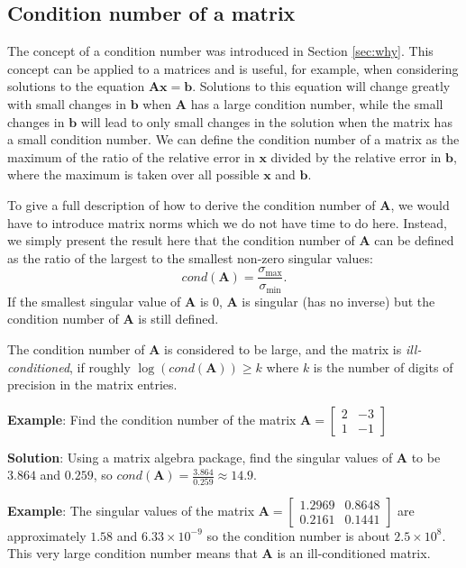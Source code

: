 \subsection{Condition number of a matrix}

The concept of a condition number was introduced in  Section \ref{sec:why}.  This concept can be applied to a matrices and is useful, for example, when considering solutions to the equation $\mathbf {Ax} = \mathbf b$.  Solutions to this equation will change greatly with  small changes in $\mathbf b$ when $\mathbf A$ has a large condition number, while the small changes in  $\mathbf b$ will lead to only small changes in the solution when the matrix has a small condition number.  We can define the condition number of a matrix as the maximum of the  ratio of the relative error in $\mathbf x$ divided by the relative error in $\mathbf b$, where the maximum is taken over all possible $\mathbf x$ and $\mathbf b$.

To give a full description of how to derive the condition number of $\mathbf A$, we would have to introduce matrix norms which we do not have time to do here.  Instead, we simply present the result here that the condition number of $\mathbf A$ can be defined as the ratio of the largest to the smallest non-zero singular values:
\[ cond(\mathbf A) = \frac{\sigma_{\max}}{\sigma_{\min}}. \]
If the smallest singular value of $\mathbf A$ is 0,  $\mathbf A$ is singular (has no inverse) but the condition number of $\mathbf A$ is still defined.



The condition number of $\mathbf A$ is considered to be large, and the matrix is {\em ill-conditioned},  if roughly $\log(cond(\mathbf A)) \geq k $ where $k$ is the number of digits of precision in the matrix entries.

{\bf Example}: Find the condition number of the matrix $\mathbf A = \left[\begin{array}{ll}2 & -3\\1&-1\end{array}\right]$

{\bf Solution}: Using a matrix algebra package, find the singular values of $\mathbf A$ to be $3.864$ and $ 0.259$, so $cond(\mathbf A) = \frac {3.864}{0.259} \approx 14.9$.  \sqend

{\bf Example}: The singular values of the matrix  $\mathbf A = \left[\begin{array}{ll} 1.2969 & 0.8648 \\ 0.2161 & 0.1441 \end{array}\right]$ are approximately $1.58$ and $6.33\times 10^{-9}$ so the condition number is about $2.5\times 10^8$.  This very large condition number means that $\mathbf A$ is an  ill-conditioned matrix.

